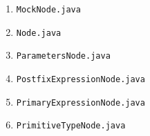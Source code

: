 \documentclass{book}
\begin{document}
\begin{itemize}
\begin{enumerate}
\begin{quotation}
\noindent 
\end{quotation}
\item \texttt{MockNode.java}
\begin{quotation}
\noindent 
\end{quotation}
\item \texttt{Node.java}
\begin{quotation}
\noindent 
\end{quotation}
\item \texttt{ParametersNode.java}
\begin{quotation}
\noindent 
\end{quotation}
\item \texttt{PostfixExpressionNode.java}
\begin{quotation}
\noindent 
\end{quotation}
\item \texttt{PrimaryExpressionNode.java}
\begin{quotation}
\noindent 
\end{quotation}
\item \texttt{PrimitiveTypeNode.java}
\begin{quotation}
\noindent 
\end{quotation}


\end{enumerate}
\end{itemize}
\end{document}
